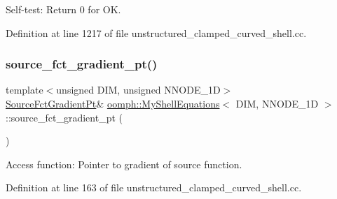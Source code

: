 Self-\/test\+: Return 0 for OK. 



Definition at line 1217 of file unstructured\+\_\+clamped\+\_\+curved\+\_\+shell.\+cc.

\mbox{\label{classoomph_1_1MyShellEquations_a1ade98830b556492e11aef07cf34d3ed}} 
\subsubsection{\texorpdfstring{source\+\_\+fct\+\_\+gradient\+\_\+pt()}{source\_fct\_gradient\_pt()}\hspace{0.1cm}{\footnotesize\ttfamily [1/2]}}
{\footnotesize\ttfamily template$<$unsigned D\+IM, unsigned N\+N\+O\+D\+E\+\_\+1D$>$ \\
\hyperlink{classoomph_1_1MyShellEquations_a954dcc1b78710f331ed390b716aa07dd}{Source\+Fct\+Gradient\+Pt}\& \hyperlink{classoomph_1_1MyShellEquations}{oomph\+::\+My\+Shell\+Equations}$<$ D\+IM, N\+N\+O\+D\+E\+\_\+1D $>$\+::source\+\_\+fct\+\_\+gradient\+\_\+pt (\begin{DoxyParamCaption}{ }\end{DoxyParamCaption})\hspace{0.3cm}{\ttfamily [inline]}}



Access function\+: Pointer to gradient of source function. 



Definition at line 163 of file unstructured\+\_\+clamped\+\_\+curved\+\_\+shell.\+cc.

\mbox{\label{classoomph_1_1MyShellEquations_aeb57d576c45c382206c6af6b8b06b575}} 
